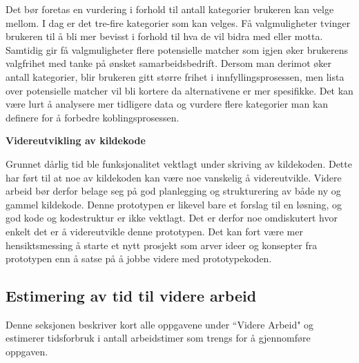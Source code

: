 Det bør foretas en vurdering i forhold til antall kategorier brukeren kan velge mellom. I dag er det tre-fire kategorier som kan velges. Få valgmuligheter tvinger brukeren til å bli mer bevisst i forhold til hva de vil bidra med eller motta. Samtidig gir få valgmuligheter flere potensielle matcher som igjen øker brukerens valgfrihet med tanke på ønsket samarbeidsbedrift. Dersom man derimot øker antall kategorier, blir brukeren gitt større frihet i innfyllingsprosessen, men lista over potensielle matcher vil bli kortere da alternativene er mer spesifikke. Det kan være lurt å analysere mer tidligere data og vurdere flere kategorier man kan definere for å forbedre koblingsprosessen.

{\bf Videreutvikling av kildekode}

Grunnet dårlig tid ble funksjonalitet vektlagt under skriving av kildekoden. Dette har ført til at noe av kildekoden kan være noe vanskelig å videreutvikle. Videre arbeid bør derfor belage seg på god planlegging og strukturering av både ny og gammel kildekode. Denne prototypen er likevel bare et forslag til en løsning, og god kode og kodestruktur er ikke vektlagt. Det er derfor noe omdiskutert hvor enkelt det er å videreutvikle denne prototypen. Det kan fort være mer hensiktsmessing å starte et nytt prosjekt som arver ideer og konsepter fra prototypen enn å satse på å jobbe videre med prototypekoden.

\subsection{Estimering av tid til videre arbeid}

Denne seksjonen beskriver kort alle oppgavene under ``Videre Arbeid" og estimerer tidsforbruk i antall arbeidstimer som trengs for å gjennomføre oppgaven.

